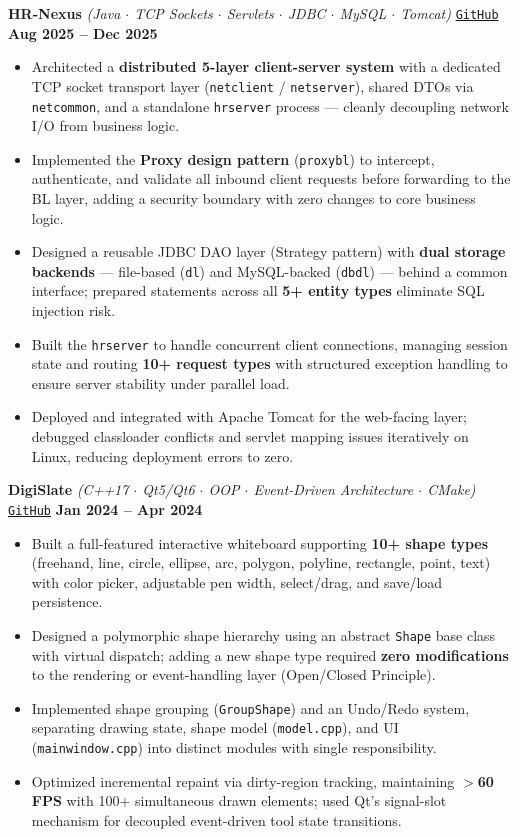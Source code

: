 \documentclass[a4paper,10pt]{article}
\begin{document}
\textbf{HR-Nexus} \textit{(Java $\cdot$ TCP Sockets $\cdot$ Servlets $\cdot$ JDBC $\cdot$ MySQL $\cdot$ Tomcat)}
\hfill \href{https://github.com/ashvin-parmar/HR-Nexus}{\texttt{GitHub}} \quad \textbf{Aug 2025 -- Dec 2025}
\begin{itemize}
  \item Architected a \textbf{distributed 5-layer client-server system} with a dedicated TCP socket transport layer (\texttt{netclient} / \texttt{netserver}), shared DTOs via \texttt{netcommon}, and a standalone \texttt{hrserver} process --- cleanly decoupling network I/O from business logic.
  \item Implemented the \textbf{Proxy design pattern} (\texttt{proxybl}) to intercept, authenticate, and validate all inbound client requests before forwarding to the BL layer, adding a security boundary with zero changes to core business logic.
  \item Designed a reusable JDBC DAO layer (Strategy pattern) with \textbf{dual storage backends} --- file-based (\texttt{dl}) and MySQL-backed (\texttt{dbdl}) --- behind a common interface; prepared statements across all \textbf{5+ entity types} eliminate SQL injection risk.
  \item Built the \texttt{hrserver} to handle concurrent client connections, managing session state and routing \textbf{10+ request types} with structured exception handling to ensure server stability under parallel load.
  \item Deployed and integrated with Apache Tomcat for the web-facing layer; debugged classloader conflicts and servlet mapping issues iteratively on Linux, reducing deployment errors to zero.
\end{itemize}

\vspace{0.5mm}

\textbf{DigiSlate} \textit{(C++17 $\cdot$ Qt5/Qt6 $\cdot$ OOP $\cdot$ Event-Driven Architecture $\cdot$ CMake)}
\hfill \href{https://github.com/ashvin-parmar/DigiSlate}{\texttt{GitHub}} \quad \textbf{Jan 2024 -- Apr 2024}
\begin{itemize}
  \item Built a full-featured interactive whiteboard supporting \textbf{10+ shape types} (freehand, line, circle, ellipse, arc, polygon, polyline, rectangle, point, text) with color picker, adjustable pen width, select/drag, and save/load persistence.
  \item Designed a polymorphic shape hierarchy using an abstract \texttt{Shape} base class with virtual dispatch; adding a new shape type required \textbf{zero modifications} to the rendering or event-handling layer (Open/Closed Principle).
  \item Implemented shape grouping (\texttt{GroupShape}) and an Undo/Redo system, separating drawing state, shape model (\texttt{model.cpp}), and UI (\texttt{mainwindow.cpp}) into distinct modules with single responsibility.
  \item Optimized incremental repaint via dirty-region tracking, maintaining \textbf{$>$60 FPS} with 100+ simultaneous drawn elements; used Qt's signal-slot mechanism for decoupled event-driven tool state transitions.
\end{itemize}
\end{document}
